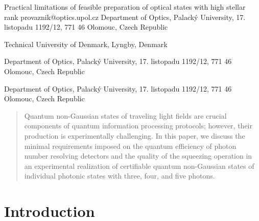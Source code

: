 \documentclass{article}
\begin{document}
\ArticleTitle
  {Practical limitations of feasible preparation of optical states with high stellar rank}
  {provaznik@optics.upol.cz}
\ArticleAuthorAddress
  {Department of Optics, Palack\'{y} University, 17. listopadu 1192/12, 771 46 Olomouc, Czech Republic}

\ArticleAuthorAddress
  {Technical University of Denmark, Lyngby, Denmark}

\ArticleAuthorAddress
  {Department of Optics, Palack\'{y} University, 17. listopadu 1192/12, 771 46 Olomouc, Czech Republic}

\ArticleAuthorAddress
  {Department of Optics, Palack\'{y} University, 17. listopadu 1192/12, 771 46 Olomouc, Czech Republic}

\ArticleTitlePrint

\begin{abstract}\noindent
  Quantum non-Gaussian states of traveling light fields are crucial components of quantum information processing protocols; however, their production is experimentally challenging. In this paper, we discuss the minimal requirements imposed on the quantum efficiency of photon number resolving detectors and the quality of the squeezing operation in an experimental realization of certifiable quantum non-Gaussian states of individual photonic states with three, four, and five photons.
\end{abstract}


%

\section{Introduction}
\end{document}
